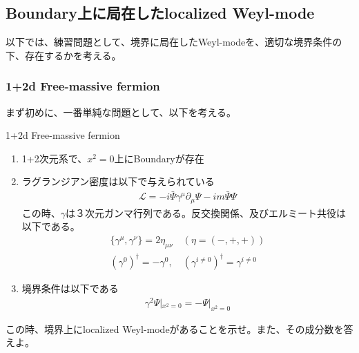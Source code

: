 \documentclass[dvipdfmx,a4paper,10.5pt]{article}
\numberwithin{equation}{section}
\begin{document}
\subsection{Boundary上に局在したlocalized Weyl-mode}
以下では、練習問題として、境界に局在したWeyl-modeを、適切な境界条件の下、存在するかを考える。

\subsubsection{1+2d Free-massive fermion}
まず初めに、一番単純な問題として、以下を考える。
\begin{problembox}{1+2d Free-massive fermion}
    \begin{enumerate}
        \item 1+2次元系で、$x^{2}=0$上にBoundaryが存在
        \item ラグランジアン密度は以下で与えられている
        \begin{align*}
            \mathcal{L}=-i\bar{\Psi}\gamma^{\mu}\partial_{\mu}\Psi-im\bar{\Psi}\Psi
        \end{align*}
        この時、$\gamma$は３次元ガンマ行列である。反交換関係、及びエルミート共役は以下である。
        \begin{gather*}
            \{\gamma^{\mu},\gamma^{\nu}\}=2\eta_{\mu\nu}\quad (\eta=(-,+,+))\\
            (\gamma^{0})^{\dagger}=-\gamma^{0},\quad (\gamma^{i\neq 0})^{\dagger}=\gamma^{i\neq 0}
        \end{gather*}
        \item 境界条件は以下である
        \begin{align*}
            \gamma^{2}\Psi|_{x^{2}=0}=-\Psi|_{x^{2}=0}
        \end{align*}
    \end{enumerate}
    この時、境界上にlocalized Weyl-modeがあることを示せ。また、その成分数を答えよ。
\end{problembox}
\end{document}
